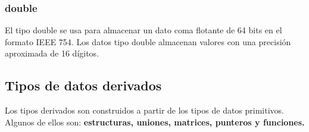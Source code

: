 \documentclass[]{article}
\begin{document}
\subsubsection{double}
El tipo double se usa para almacenar un dato coma flotante de 64 bits en el formato IEEE 754. Los datos tipo double almacenan valores con una precisión aproximada de 16 dígitos.

\subsection{Tipos de datos derivados}
Los tipos derivados son construidos a partir de los tipos de datos primitivos. Algunos de ellos son: \textbf{estructuras, uniones, matrices, punteros y funciones.}
\end{document}

